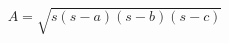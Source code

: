 \documentclass[12pt]{article}
\begin{document}
\[
    A = \sqrt{s(s - a)(s - b)(s - c)}
\]
\end{document}
